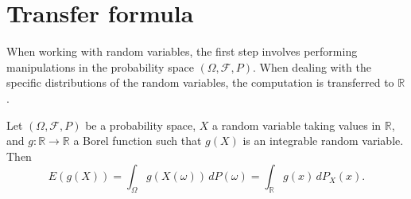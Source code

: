 \section{Transfer formula}%
When working with random variables, the first step involves performing manipulations in the probability space $(\Omega, \mathcal{F}, P)$. When dealing with the specific distributions of the random variables, the computation is transferred to $\mathbb{R}$.%
\begin{proposition}
Let $(\Omega, \mathcal{F}, P)$ be a probability space, $X$ a random variable taking values in $\mathbb{R}$, and $g: \mathbb{R} \to \mathbb{R}$ a Borel function such that $g(X)$ is an integrable random variable. Then
\[ E(g(X)) = \int_{\Omega} g(X(\omega)) \,dP(\omega) = \int_{\mathbb{R}} g(x) \,dP_X(x). \]
\end{proposition}%
